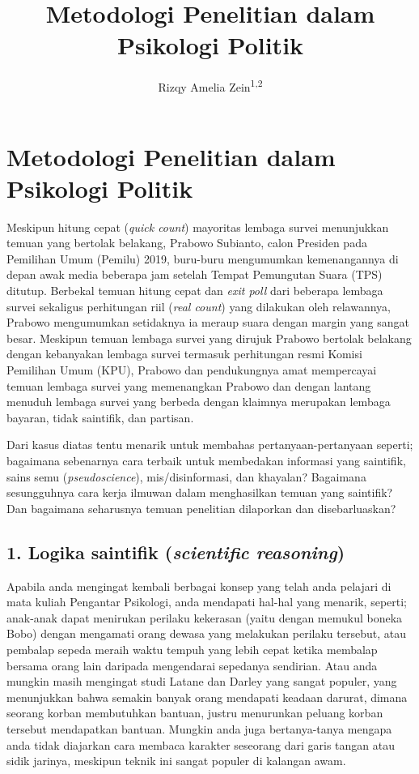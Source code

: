 \documentclass[
  english,
  man]{apa6}
\author{Rizqy Amelia Zein\textsuperscript{1,2}}
\affiliation{
\vspace{0.5cm}
\textsuperscript{1} Departemen Psikologi Kepribadian dan Sosial, Fakultas Psikologi Universitas Airlangga\\\textsuperscript{2} Institute for Globally Distributed Open Research and Education (IGDORE)}
\title{Metodologi Penelitian dalam Psikologi Politik}
\date{}
\begin{document}
\maketitle

\hypertarget{metodologi-penelitian-dalam-psikologi-politik}{%
\section{Metodologi Penelitian dalam Psikologi Politik}\label{metodologi-penelitian-dalam-psikologi-politik}}

Meskipun hitung cepat (\emph{quick count}) mayoritas lembaga survei menunjukkan temuan yang bertolak belakang, Prabowo Subianto, calon Presiden pada Pemilihan Umum (Pemilu) 2019, buru-buru mengumumkan kemenangannya di depan awak media beberapa jam setelah Tempat Pemungutan Suara (TPS) ditutup. Berbekal temuan hitung cepat dan \emph{exit poll} dari beberapa lembaga survei sekaligus perhitungan riil (\emph{real count}) yang dilakukan oleh relawannya, Prabowo mengumumkan setidaknya ia meraup suara dengan margin yang sangat besar. Meskipun temuan lembaga survei yang dirujuk Prabowo bertolak belakang dengan kebanyakan lembaga survei termasuk perhitungan resmi Komisi Pemilihan Umum (KPU), Prabowo dan pendukungnya amat mempercayai temuan lembaga survei yang memenangkan Prabowo dan dengan lantang menuduh lembaga survei yang berbeda dengan klaimnya merupakan lembaga bayaran, tidak saintifik, dan partisan.

Dari kasus diatas tentu menarik untuk membahas pertanyaan-pertanyaan seperti; bagaimana sebenarnya cara terbaik untuk membedakan informasi yang saintifik, sains semu (\emph{pseudoscience}), mis/disinformasi, dan khayalan? Bagaimana sesungguhnya cara kerja ilmuwan dalam menghasilkan temuan yang saintifik? Dan bagaimana seharusnya temuan penelitian dilaporkan dan disebarluaskan?

\hypertarget{logika-saintifik-scientific-reasoning}{%
\subsection{\texorpdfstring{1. Logika saintifik (\emph{scientific reasoning})}{1. Logika saintifik (scientific reasoning)}}\label{logika-saintifik-scientific-reasoning}}

Apabila anda mengingat kembali berbagai konsep yang telah anda pelajari di mata kuliah Pengantar Psikologi, anda mendapati hal-hal yang menarik, seperti; anak-anak dapat menirukan perilaku kekerasan (yaitu dengan memukul boneka Bobo) dengan mengamati orang dewasa yang melakukan perilaku tersebut, atau pembalap sepeda meraih waktu tempuh yang lebih cepat ketika membalap bersama orang lain daripada mengendarai sepedanya sendirian. Atau anda mungkin masih mengingat studi Latane dan Darley yang sangat populer, yang menunjukkan bahwa semakin banyak orang mendapati keadaan darurat, dimana seorang korban membutuhkan bantuan, justru menurunkan peluang korban tersebut mendapatkan bantuan. Mungkin anda juga bertanya-tanya mengapa anda tidak diajarkan cara membaca karakter seseorang dari garis tangan atau sidik jarinya, meskipun teknik ini sangat populer di kalangan awam.
\end{document}
